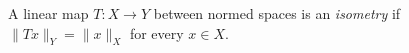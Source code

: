 
A linear map $T:X\to Y$ between normed spaces is an \emph{isometry} if $\|Tx\|_Y=\|x\|_X$ for every $x\in X$.
